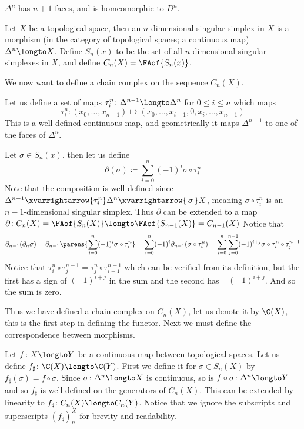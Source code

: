 \edefn

$\Delta^n$ has $n+1$ faces, and is homeomorphic to $D^n$.

\bdefn

    Let $X$ be a topological space, then an {\emphcolor $n$-dimensional singular simplex} in $X$ is a morphism (in the category of topological spaces; a continuous map) $\Delta^n\longto X$.
    Define $S_n(x)$ to be the set of all $n$-dimensional singular simplexes in $X$, and define $C_n(X)=\FAof{S_n(x)}$.

\edefn

We now want to define a chain complex on the sequence $C_n(X)$.

Let us define a set of maps $\tau_i^n\colon\Delta^{n-1}\longto\Delta^n$ for $0\leq i\leq n$ which maps
$$ \tau_i^n\colon (x_0,\dots,x_{n-1})\mapsto(x_0,\dots,x_{i-1},0,x_i,\dots,x_{n-1}) $$
This is a well-defined continuous map, and geometrically it maps $\Delta^{n-1}$ to one of the faces of $\Delta^n$.

Let $\sigma\in S_n(x)$, then let us define
$$ \partial(\sigma) \coloneqq \sum_{i=0}^n(-1)^i\sigma\circ\tau_i^n $$
Note that the composition is well-defined since $\Delta^{n-1}\xvarrightarrow{\tau_i^n}\Delta^n\xvarrightarrow{\,\sigma\,}X$, meaning $\sigma\circ\tau_i^n$ is an $n-1$-dimensional singular simplex.
Thus $\partial$ can be extended to a map $\partial\colon C_n(X)=\FAof{S_n(X)}\longto\FAof{S_{n-1}(X)}=C_{n-1}(X)$
Notice that
$$ \partial_{n-1}(\partial_n\sigma) = \partial_{n-1}\parens{\sum_{i=0}^n(-1)^i\sigma\circ\tau_i^n} = \sum_{i=0}^n(-1)^i\partial_{n-1}(\sigma\circ\tau_i^n) =
\sum_{i=0}^n\sum_{j=0}^{n-1}(-1)^{i+j}\sigma\circ\tau_i^n\circ\tau_j^{n-1} $$
Notice that $\tau^n_i\circ\tau_j^{n-1}=\tau^n_j\circ\tau^{n-1}_{i-1}$ which can be verified from its definition, but the first has a sign of $(-1)^{i+j}$ in the sum and the second has $-(-1)^{i+j}$.
And so the sum is zero.

Thus we have defined a chain complex on $C_n(X)$, let us denote it by $\C(X)$, this is the first step in defining the functor.
Next we must define the correspondence between morphisms.

Let $f\colon X\longto Y$ be a continuous map between topological spaces.
Let us define $f_\sharp\colon\C(X)\longto\C(Y)$.
First we define it for $\sigma\in S_n(X)$ by $f_\sharp(\sigma)=f\circ\sigma$.
Since $\sigma\colon\Delta^n\longto X$ is continuous, so is $f\circ\sigma\colon\Delta^n\longto Y$ and so $f_\sharp$ is well-defined on the generators of $C_n(X)$.
This can be extended by linearity to $f_\sharp\colon C_n(X)\longto C_n(Y)$.
Notice that we ignore the subscripts and superscripts $(f_\sharp)_n^X$ for brevity and readability.

